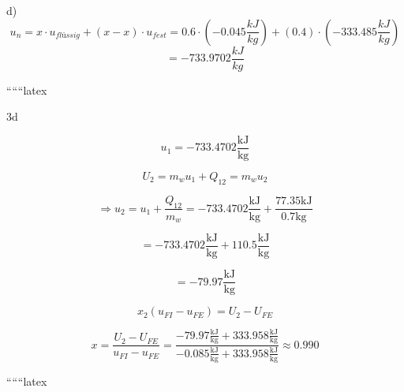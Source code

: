 d) 
\[
u_n = x \cdot u_{flüssig} + (x - x) \cdot u_{fest} = 0.6 \cdot (-0.045 \frac{kJ}{kg}) + (0.4) \cdot (-333.485 \frac{kJ}{kg})
\]
\[
= -733.9702 \frac{kJ}{kg}
\]

``````latex

3d

\[
u_1 = -733.4702 \frac{\text{kJ}}{\text{kg}}
\]

\[
U_2 = m_{w} u_1 + Q_{12} = m_{w} u_2
\]

\[
\Rightarrow u_2 = u_1 + \frac{Q_{12}}{m_{w}} = -733.4702 \frac{\text{kJ}}{\text{kg}} + \frac{77.35 \text{kJ}}{0.7 \text{kg}}
\]

\[
= -733.4702 \frac{\text{kJ}}{\text{kg}} + 110.5 \frac{\text{kJ}}{\text{kg}}
\]

\[
= -79.97 \frac{\text{kJ}}{\text{kg}}
\]

\[
x_2 (u_{FI} - u_{FE}) = U_2 - U_{FE}
\]

\[
x = \frac{U_2 - U_{FE}}{u_{FI} - u_{FE}} = \frac{-79.97 \frac{\text{kJ}}{\text{kg}} + 333.958 \frac{\text{kJ}}{\text{kg}}}{-0.085 \frac{\text{kJ}}{\text{kg}} + 333.958 \frac{\text{kJ}}{\text{kg}}} \approx 0.990
\]

``````latex